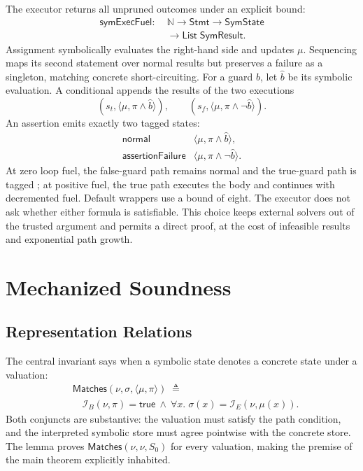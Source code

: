 \documentclass[10pt,twocolumn]{article}
\newcommand{\code}[1]{\texttt{\detokenize{#1}}}
\begin{document}
The executor returns all unpruned outcomes under an explicit bound:
\begin{align*}
 \mathsf{symExecFuel}:\;&\mathbb{N}\rightarrow\mathsf{Stmt}\rightarrow\mathsf{SymState}\\[-2pt]
 &\rightarrow\mathsf{List}\;\mathsf{SymResult}.
\end{align*}
Assignment symbolically evaluates the right-hand side and updates $\mu$.
Sequencing maps its second statement over normal results but preserves a failure
as a singleton, matching concrete short-circuiting.  For a guard $b$, let
$\widehat b$ be its symbolic evaluation.  A conditional appends the results of
the two executions
\[
 (s_t,\langle\mu,\pi\land\widehat b\rangle),\qquad
 (s_f,\langle\mu,\pi\land\neg\widehat b\rangle).
\]
An assertion emits exactly two tagged states:
\[
 \begin{array}{ll}
 \mathsf{normal}             & \langle\mu,\pi\land\widehat b\rangle,\\
 \mathsf{assertionFailure}   & \langle\mu,\pi\land\neg\widehat b\rangle.
 \end{array}
\]
At zero loop fuel, the false-guard path remains normal and the true-guard path is
tagged \code{fuelExhausted}; at positive fuel, the true path executes the body
and continues with decremented fuel.  Default wrappers use a bound of eight.
The executor does not ask whether either formula is satisfiable.  This choice
keeps external solvers out of the trusted argument and permits a direct proof,
at the cost of infeasible results and exponential path growth.

\section{Mechanized Soundness}

\subsection{Representation Relations}

The central invariant says when a symbolic state denotes a concrete state under
a valuation:
\begin{align*}
&\mathsf{Matches}(\nu,\sigma,\langle\mu,\pi\rangle) \;\triangleq\\
&\quad \mathcal I_B(\nu,\pi)=\mathsf{true}
 \ \land\ \forall x.\;\sigma(x)=\mathcal I_E(\nu,\mu(x)).
\end{align*}
Both conjuncts are substantive: the valuation must satisfy the path condition,
and the interpreted symbolic store must agree pointwise with the concrete store.
The lemma \code{initial_matches} proves
$\mathsf{Matches}(\nu,\nu,S_0)$ for every valuation, making the premise of the
main theorem explicitly inhabited.
\end{document}
